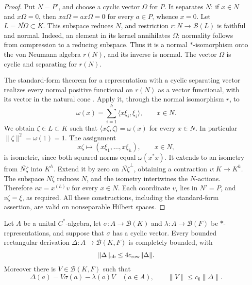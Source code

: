 \begin{proof}
Put \(N=P'\), and choose a cyclic vector \(\Omega\) for \(P\).
It separates \(N\): if \(x\in N\) and \(x\Omega=0\), then
\(xa\Omega=ax\Omega=0\) for every \(a\in P\), whence \(x=0\).
Let \(L=\overline{N\Omega}\subset K\). This subspace reduces \(N\),
and restriction \(r:N\to\mathcal B(L)\) is faithful and normal.
Indeed, an element in its kernel annihilates \(\Omega\); normality
follows from compression to a reducing subspace. Thus it is a normal
\(*\)-isomorphism onto the von Neumann algebra \(r(N)\), and its
inverse is normal. The vector \(\Omega\) is cyclic and separating for
\(r(N)\).

The standard-form theorem for a representation with a cyclic separating
vector realizes every normal positive functional on \(r(N)\) as a
vector functional, with its vector in the natural cone
\citep[Lemma~2.10(1), pp.~278--279]{Haagerup1975}.
Apply it, through the normal isomorphism \(r\),
to
\[
 \omega(x)=\sum_{i=1}^h\langle x\xi_i,\xi_i\rangle,
 \qquad x\in N.
\]
We obtain \(\zeta\in L\subset K\) such that
\(\langle x\zeta,\zeta\rangle=\omega(x)\) for every \(x\in N\).
In particular \(\|\zeta\|^2=\omega(1)=1\). The assignment
\[
 x\zeta\longmapsto(x\xi_1,\ldots,x\xi_h),\qquad x\in N,
\]
is isometric, since both squared norms equal \(\omega(x^*x)\).
It extends to an isometry from \(\overline{N\zeta}\) into \(K^h\).
Extend it by zero on \(\overline{N\zeta}^{\perp}\), obtaining a
contraction \(v:K\to K^h\). The subspace \(\overline{N\zeta}\)
reduces \(N\), and the isometry intertwines the \(N\)-actions.
Therefore \(vx=x^{(h)}v\) for every \(x\in N\). Each coordinate
\(v_i\) lies in \(N'=P\), and \(v\zeta=\xi\), as required.
All these constructions, including the standard-form assertion, are
valid on nonseparable Hilbert spaces.
\end{proof}

\begin{lemma}
\label{lem:cyclic-implementation}
Let \(A\) be a unital \(C^*\)-algebra, let
\(\sigma:A\to\mathcal B(K)\) and
\(\lambda:A\to\mathcal B(F)\) be \(*\)-representations, and suppose
that \(\sigma\) has a cyclic vector. Every bounded rectangular
derivation \(\Delta:A\to\mathcal B(K,F)\) is completely bounded,
with
\begin{equation}
 \|\Delta\|_{\mathrm{cb}}\le4c_{\rm row}\|\Delta\|.
 \label{eq:cyclic-cb}
\end{equation}
Moreover there is \(V\in\mathcal B(K,F)\) such that
\begin{equation}
 \Delta(a)=V\sigma(a)-\lambda(a)V\quad(a\in A),\qquad
 \|V\|\le c_0\|\Delta\|.
 \label{eq:cyclic-implementation}
\end{equation}
\end{lemma}

